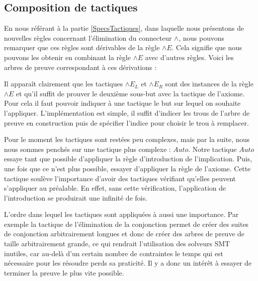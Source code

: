 \documentclass[titlepage,draft]{article}
\begin{document}
\subsection{Composition de tactiques}
En nous référant à la partie \ref{SpecsTactiques}, dans laquelle nous présentons de nouvelles règles concernant l'élimination du connecteur $\land$, nous pouvons remarquer que ces règles sont dérivables de la règle $\land E$. Cela signifie que nous pouvons les obtenir en combinant la règle $\land E$ avec d'autres règles. Voici les arbres de preuve correspondant à ces dérivations :
Il apparaît clairement que les tactiques $\land E_L$ et $\land E_R$ sont des instances de la règle $\land E$ et qu'il suffit de prouver le deuxième sous-but avec la tactique de l'axiome. Pour cela il faut pouvoir indiquer à une tactique le but sur lequel on souhaite l'appliquer. L'implémentation est simple, il suffit d'indicer les trous de l'arbre de preuve en construction puis de spécifier l'indice pour choisir le trou à remplacer.

Pour le moment les tactiques sont restées peu complexes, mais par la suite, nous nous sommes penchés sur une tactique plus complexe : $Auto$. Notre tactique $Auto$ essaye tant que possible d'appliquer la règle d'introduction de l'implication. Puis, une fois que ce n'est plus possible, essayer d'appliquer la règle de l'axiome. Cette tactique soulève l'importance d'avoir des tactiques vérifiant qu'elles peuvent s'appliquer au préalable. En effet, sans cette vérification, l'application de l'introduction se produirait une infinité de fois.

L'ordre dans lequel les tactiques sont appliquées à aussi une importance. Par exemple la tactique de l'élimination de la conjonction permet de créer des suites de conjonction arbitrairement longues et donc de créer des arbres de preuve de taille arbitrairement grande, ce qui rendrait l'utilisation des solveurs SMT inutiles, car au-delà d'un certain nombre de contraintes le temps qui est nécessaire pour les résoudre perds sa praticité. Il y a donc un intérêt à essayer de terminer la preuve le plus vite possible.
\end{document}
